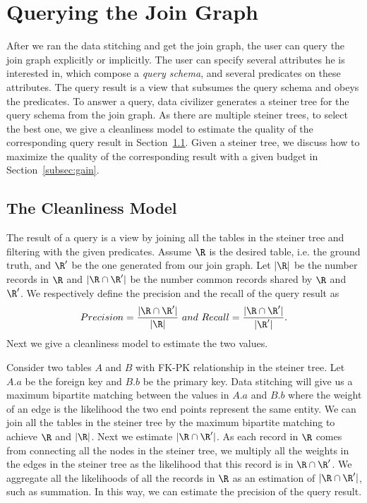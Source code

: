 

\section{Querying the Join Graph}\label{sec:enhancedstitching}


After we ran the data stitching and get the join graph, the user can query the
join graph explicitly or implicitly. The user can specify several attributes he
is interested in, which compose a \emph{query schema}, and several predicates on
these attributes. The query result is a view that subsumes the query schema and
obeys the predicates. To answer a query, data civilizer generates a steiner tree
for the query schema from the join graph. As there are multiple steiner trees,
to select the best one, we give a cleanliness model to estimate the quality of
the corresponding query result in Section~\ref{subsec:model:recall}. Given a
steiner tree, we discuss how to maximize the quality of the corresponding result
with a given budget in Section~\ref{subsec:gain}.





\subsection{The Cleanliness Model}\label{subsec:model:recall}

The result of a query is a view by joining all the tables in the steiner tree and filtering with the given predicates. Assume $\R$ is the desired table, i.e. the ground truth, and $\R'$ be the one generated from our join graph. Let  $|\R|$ be the number records in $\R$ and $|\R\cap\R'|$ be the number common records shared by $\R$ and $\R'$. We respectively define the precision and the recall of the query result as
$$Precision=\frac{|\R\cap\R'|}{|\R|}~and~Recall=\frac{|\R\cap\R'|}{|\R'|}.$$
Next we give a cleanliness model to estimate the two values.



Consider two tables $A$ and $B$ with FK-PK relationship in the steiner tree. Let $A.a$ be the foreign key and $B.b$ be the primary key. Data stitching will give us a maximum bipartite matching between the values in $A.a$ and $B.b$ where the weight of an edge is the likelihood the two end points represent the same entity. We can join all the tables in the steiner tree by the maximum bipartite matching to achieve $\R$ and $|\R|$. Next we estimate $|\R\cap\R'|$. As each record in $\R$ comes from connecting all the nodes in the steiner tree, we multiply all the weights in the edges in the steiner tree as the likelihood that this record is in $\R\cap\R'$. We aggregate all the likelihoods of all the records in $\R$ as an estimation of $|\R\cap\R'|$, such as summation. In this way, we can estimate the precision of the query result.


